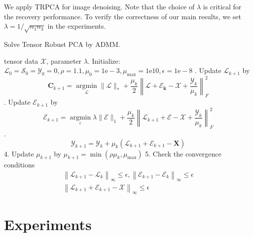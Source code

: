 \documentclass[english]{article}
\newcommand{\<}{\langle}
\renewcommand{\>}{\rangle}
\theoremstyle{definition}
\begin{document}
We apply TRPCA for image denoising. Note that the choice of $ \lambda $ is critical for the recovery performance. To verify the correctness of our main results, we set $ \lambda=1 / \sqrt{n_{1} n_{3}} $ in the experiments.\\
\begin{algorithm}  
	\caption{Solve Tensor Robust PCA by ADMM.}
	\begin{algorithmic} 
		\Require  
		tensor data $ \mathcal{X} $, parameter $ \lambda $.
		\State  Initialize: $ \mathcal{L}_{0}=\mathcal{S}_{0}=\mathcal{Y}_{0}=0, \rho=1.1, \mu_{0}=1 \mathrm{e}-3, 
		\mu_{\max }=1 \mathrm{e} 10, \epsilon=1 \mathrm{e}-8 $
		. Update $ \mathcal{L}_{k+1} $ by
		$$ \boldsymbol{C}_{k+1}=\underset{\boldsymbol{\boldsymbol{\mathcal { L }}}}{\operatorname{argmin}}\|\boldsymbol{\mathcal { L }}\|_{*}+\frac{\mu_{k}}{2}\left\|\boldsymbol{\mathcal{L}}+\boldsymbol{\mathcal{E}_k}-\boldsymbol{\mathcal{X}}+\frac{\boldsymbol{\mathcal{Y}}_{k}}{\mu_{k}}\right\|_{F}^{2} $$
		. Update $ \mathcal{E}_{k+1} $ by
		$$
		\mathcal{E}_{k+1}=\underset{\varepsilon}{\operatorname{argmin}} \lambda\|\mathcal{E}\|_{1}+\frac{\mu_{k}}{2}\left\|\boldsymbol{\mathcal{L}}_{k+1}+\boldsymbol{\mathcal{E}}-\boldsymbol{\mathcal{X}}+\frac{\boldsymbol{\mathcal{Y}}_{k}}{\mu_{k}}\right\|_{F}^{2} $$
		.  $$\boldsymbol{\mathcal{Y}}_{k+1}=\boldsymbol{\mathcal{Y}}_{k}+\mu_{k}\left(\mathcal{L}_{k+1}+\mathcal{E}_{k+1}-\boldsymbol{X}\right) $$
		4. Update $ \mu_{k+1} $ by $ \mu_{k+1}=\min \left(\rho \mu_{k}, \mu_{\max }\right) $
		5. Check the convergence conditions
		\begin{equation*}
		\begin{array}{l}
		\left\|\mathcal{L}_{k+1}-\mathcal{L}_{k}\right\|_{\infty} \leq \epsilon,\left\|\mathcal{E}_{k+1}-\mathcal{E}_{k}\right\|_{\infty} \leq \epsilon \\
		\left\|\mathcal{L}_{k+1}+\mathcal{E}_{k+1}-\mathcal{X}\right\|_{\infty} \leq \epsilon
		\end{array}
		\end{equation*}
		
		\EndWhile 
	\end{algorithmic}
\end{algorithm}


\section{Experiments}
\end{document}
